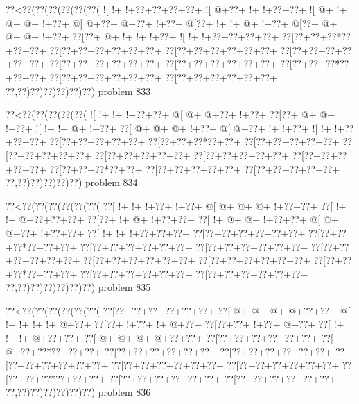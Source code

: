 \vbox{\vbox{\goo
\0??<\0??(\0??(\0??(\0??(\0??(\0??(
\- ![\- !+\- !+\0??+\0??+\0??+\0??+
\- ![\- @+\0??+\- !+\- !+\0??+\0??+
\- ![\- @+\- !+\- @+\- @+\- !+\0??+
\- @[\- @+\0??+\- @+\0??+\- !+\0??+
\- @[\0??+\- !+\- !+\- @+\- !+\0??+
\- @[\0??+\- @+\- @+\- @+\- !+\0??+
\0??[\0??+\- @+\- !+\- !+\- !+\0??+
\- ![\- !+\- !+\0??+\0??+\0??+\0??+
\0??[\0??+\0??+\0??*\0??+\0??+\0??+
\0??[\0??+\0??+\0??+\0??+\0??+\0??+
\0??[\0??+\0??+\0??+\0??+\0??+\0??+
\0??[\0??+\0??+\0??+\0??+\0??+\0??+
\0??[\0??+\0??+\0??+\0??+\0??+\0??+
\0??[\0??+\0??+\0??+\0??+\0??+\0??+
\0??[\0??+\0??+\0??*\0??+\0??+\0??+
\0??[\0??+\0??+\0??+\0??+\0??+\0??+
\0??[\0??+\0??+\0??+\0??+\0??+\0??+
\0??,\0??)\0??)\0??)\0??)\0??)\0??)
}
\hfil problem 833\hfil\break
}

\vbox{\vbox{\goo
\0??<\0??(\0??(\0??(\0??(\0??(
\- ![\- !+\- !+\- !+\0??+\0??+
\- @[\- @+\- @+\0??+\- !+\0??+
\0??[\0??+\- @+\- @+\- !+\0??+
\- ![\- !+\- !+\- @+\- !+\0??+
\0??[\- @+\- @+\- @+\- !+\0??+
\- @[\- @+\0??+\- !+\- !+\0??+
\- ![\- !+\- !+\0??+\0??+\0??+
\0??[\0??+\0??+\0??+\0??+\0??+
\0??[\0??+\0??+\0??*\0??+\0??+
\0??[\0??+\0??+\0??+\0??+\0??+
\0??[\0??+\0??+\0??+\0??+\0??+
\0??[\0??+\0??+\0??+\0??+\0??+
\0??[\0??+\0??+\0??+\0??+\0??+
\0??[\0??+\0??+\0??+\0??+\0??+
\0??[\0??+\0??+\0??*\0??+\0??+
\0??[\0??+\0??+\0??+\0??+\0??+
\0??[\0??+\0??+\0??+\0??+\0??+
\0??,\0??)\0??)\0??)\0??)\0??)
}
\hfil problem 834\hfil\break
}

\vbox{\vbox{\goo
\0??<\0??(\0??(\0??(\0??(\0??(\0??(
\0??[\- !+\- !+\- !+\0??+\- !+\0??+
\- @[\- @+\- @+\- @+\- !+\0??+\0??+
\0??[\- !+\- !+\- @+\0??+\0??+\0??+
\0??[\0??+\- !+\- @+\- !+\0??+\0??+
\0??[\- !+\- @+\- @+\- !+\0??+\0??+
\- @[\- @+\- @+\0??+\- !+\0??+\0??+
\0??[\- !+\- !+\- !+\0??+\0??+\0??+
\0??[\0??+\0??+\0??+\0??+\0??+\0??+
\0??[\0??+\0??+\0??*\0??+\0??+\0??+
\0??[\0??+\0??+\0??+\0??+\0??+\0??+
\0??[\0??+\0??+\0??+\0??+\0??+\0??+
\0??[\0??+\0??+\0??+\0??+\0??+\0??+
\0??[\0??+\0??+\0??+\0??+\0??+\0??+
\0??[\0??+\0??+\0??+\0??+\0??+\0??+
\0??[\0??+\0??+\0??*\0??+\0??+\0??+
\0??[\0??+\0??+\0??+\0??+\0??+\0??+
\0??[\0??+\0??+\0??+\0??+\0??+\0??+
\0??,\0??)\0??)\0??)\0??)\0??)\0??)
}
\hfil problem 835\hfil\break
}

\vbox{\vbox{\goo
\0??<\0??(\0??(\0??(\0??(\0??(\0??(
\0??[\0??+\0??+\0??+\0??+\0??+\0??+
\0??[\- @+\- @+\- @+\- @+\0??+\0??+
\- @[\- !+\- !+\- !+\- !+\- @+\0??+
\0??[\0??+\- !+\0??+\- !+\- @+\0??+
\0??[\0??+\0??+\- !+\0??+\- @+\0??+
\0??[\- !+\- !+\- !+\- @+\0??+\0??+
\0??[\- @+\- @+\- @+\- @+\0??+\0??+
\0??[\0??+\0??+\0??+\0??+\0??+\0??+
\0??[\- @+\0??+\0??*\0??+\0??+\0??+
\0??[\0??+\0??+\0??+\0??+\0??+\0??+
\0??[\0??+\0??+\0??+\0??+\0??+\0??+
\0??[\0??+\0??+\0??+\0??+\0??+\0??+
\0??[\0??+\0??+\0??+\0??+\0??+\0??+
\0??[\0??+\0??+\0??+\0??+\0??+\0??+
\0??[\0??+\0??+\0??*\0??+\0??+\0??+
\0??[\0??+\0??+\0??+\0??+\0??+\0??+
\0??[\0??+\0??+\0??+\0??+\0??+\0??+
\0??,\0??)\0??)\0??)\0??)\0??)\0??)
}
\hfil problem 836\hfil\break
}

